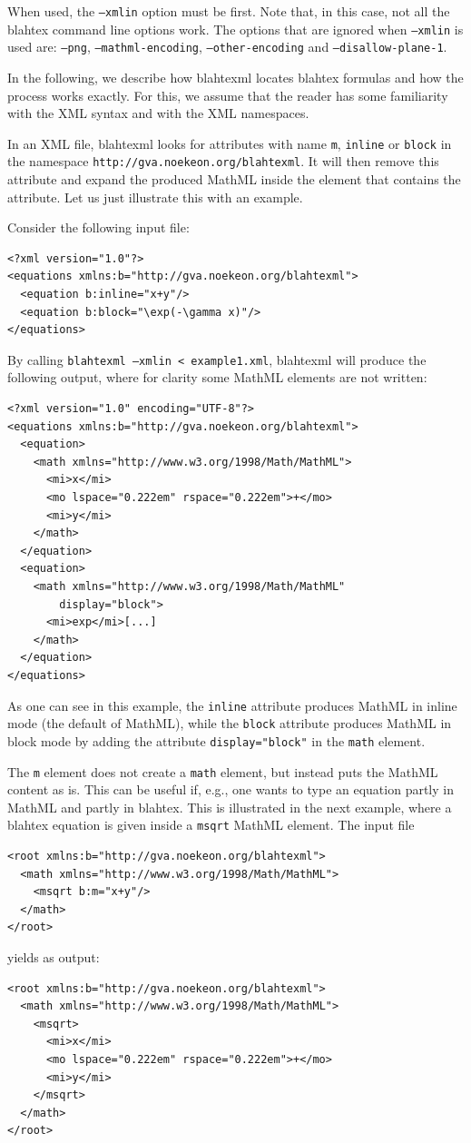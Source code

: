 \documentclass{article}
\begin{document}
When used, the \texttt{--xmlin} option must be first. Note that, in this case, not all the blahtex command line options work. The options that are ignored when \texttt{--xmlin} is used are: \texttt{--png}, \texttt{--mathml-encoding}, \texttt{--other-encoding} and \texttt{--disallow-plane-1}.

In the following, we describe how blahtexml locates blahtex formulas and how the process works exactly. For this, we assume that the reader has some familiarity with the XML syntax and with the XML namespaces.

In an XML file, blahtexml looks for attributes with name \texttt{m}, \texttt{inline} or \texttt{block} in the namespace \texttt{http://gva.noekeon.org/blahtexml}. It will then remove this attribute and expand the produced MathML inside the element that contains the attribute. Let us just illustrate this with an example.

Consider the following input file:
\begin{verbatim}
<?xml version="1.0"?>
<equations xmlns:b="http://gva.noekeon.org/blahtexml">
  <equation b:inline="x+y"/>
  <equation b:block="\exp(-\gamma x)"/>
</equations>
\end{verbatim}

By calling \texttt{blahtexml --xmlin < example1.xml}, blahtexml will produce the following output, where for clarity some MathML elements are not written:
\begin{verbatim}
<?xml version="1.0" encoding="UTF-8"?>
<equations xmlns:b="http://gva.noekeon.org/blahtexml">
  <equation>
    <math xmlns="http://www.w3.org/1998/Math/MathML">
      <mi>x</mi>
      <mo lspace="0.222em" rspace="0.222em">+</mo>
      <mi>y</mi>
    </math>
  </equation>
  <equation>
    <math xmlns="http://www.w3.org/1998/Math/MathML"
        display="block">
      <mi>exp</mi>[...]
    </math>
  </equation>
</equations>
\end{verbatim}

As one can see in this example, the \texttt{inline} attribute produces MathML in inline mode (the default of MathML), while the \texttt{block} attribute produces MathML in block mode by adding the attribute \texttt{display="block"} in the \texttt{math} element.

The \texttt{m} element does not create a \texttt{math} element, but instead puts the MathML content as is. This can be useful if, e.g., one wants to type an equation partly in MathML and partly in blahtex. This is illustrated in the next example, where a blahtex equation is given inside a \texttt{msqrt} MathML element. The input file
\begin{verbatim}
<root xmlns:b="http://gva.noekeon.org/blahtexml">
  <math xmlns="http://www.w3.org/1998/Math/MathML">
    <msqrt b:m="x+y"/>
  </math>
</root>
\end{verbatim}
yields as output:
\begin{verbatim}
<root xmlns:b="http://gva.noekeon.org/blahtexml">
  <math xmlns="http://www.w3.org/1998/Math/MathML">
    <msqrt>
      <mi>x</mi>
      <mo lspace="0.222em" rspace="0.222em">+</mo>
      <mi>y</mi>
    </msqrt>
  </math>
</root>
\end{verbatim}
\end{document}

